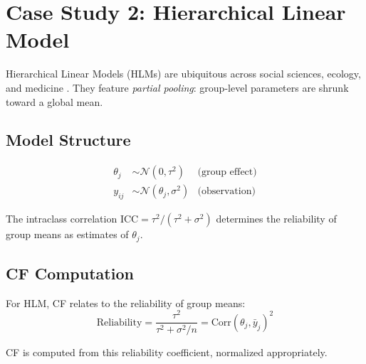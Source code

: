 \documentclass[10pt]{article} %
\theoremstyle{plain}
\theoremstyle{definition}
\begin{document}
\section{Case Study 2: Hierarchical Linear Model}
\label{sec:hlm}

Hierarchical Linear Models (HLMs) are ubiquitous across social sciences, ecology, and medicine \citep{raudenbush1986hierarchical}. They feature \emph{partial pooling}: group-level parameters are shrunk toward a global mean.

\subsection{Model Structure}

\begin{align}
\theta_j &\sim \mathcal{N}(0, \tau^2) & \text{(group effect)} \\
y_{ij} &\sim \mathcal{N}(\theta_j, \sigma^2) & \text{(observation)}
\end{align}

The intraclass correlation $\text{ICC} = \tau^2 / (\tau^2 + \sigma^2)$ determines the reliability of group means as estimates of $\theta_j$.

\subsection{CF Computation}

For HLM, CF relates to the reliability of group means:
\begin{equation}
\text{Reliability} = \frac{\tau^2}{\tau^2 + \sigma^2/n} = \text{Corr}(\theta_j, \bar{y}_j)^2
\end{equation}

CF is computed from this reliability coefficient, normalized appropriately.
\end{document}
